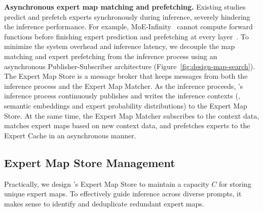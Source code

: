 \textbf{Asynchronous expert map matching and prefetching.} 
Existing studies~\cite{eliseev2023fast,xue2024moe} predict and prefetch experts synchronously during inference, severely hindering the inference performance. 
% 
For example, MoE-Infinity~\cite{xue2024moe} cannot compute forward functions before finishing expert prediction and prefetching at every \MoE layer~\cite{moe-infinity-code}.
To minimize the system overhead and inference latency, we decouple the map matching and expert prefetching from the inference process using an asynchronous Publisher-Subscriber architecture (Figure~\ref{fig:design-map-search}).
The Expert Map Store is a message broker that keeps messages from both the inference process and the Expert Map Matcher. 
% 
As the inference proceeds, \sys's inference process continuously publishes and writes the inference contexts (\ie, semantic embeddings and expert probability distributions) to the Expert Map Store. At the same time, the Expert Map Matcher subscribes to the context data, matches expert maps based on new context data, and prefetches experts to the Expert Cache in an asynchronous manner.



\subsection{Expert Map Store Management}
\label{subsec:design-expert-map-store}

Practically, we design \sys's Expert Map Store to maintain a capacity $C$ for storing unique expert maps.
To effectively guide inference across diverse prompts, it makes sense to identify and deduplicate redundant expert maps.

